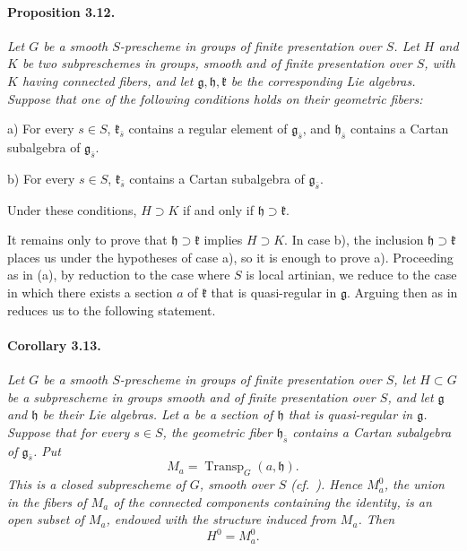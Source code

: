 
\paragraph{\textbf{Proposition 3.12.}}
{\itshape Let \(G\) be a smooth \(S\)-prescheme in groups of finite
presentation over \(S\). Let \(H\) and \(K\) be two subpreschemes
in groups, smooth and of finite presentation over \(S\), with
\(K\) having connected fibers, and let
\(\mathfrak g,\mathfrak h,\mathfrak k\) be the corresponding Lie
algebras. Suppose that one of the following conditions holds on
their geometric fibers:

\smallskip
\noindent
\textup{a)}
For every \(s\in S\), \(\mathfrak k_{\bar s}\) contains a regular
element of \(\mathfrak g_{\bar s}\), and
\(\mathfrak h_{\bar s}\) contains a Cartan subalgebra of
\(\mathfrak g_{\bar s}\).

\smallskip
\noindent
\textup{b)}
For every \(s\in S\), \(\mathfrak k_{\bar s}\) contains a Cartan
subalgebra of \(\mathfrak g_{\bar s}\).

\smallskip
\noindent
Under these conditions, \(H\supset K\) if and only if
\(\mathfrak h\supset\mathfrak k\).}

It remains only to prove that
\(\mathfrak h\supset\mathfrak k\) implies \(H\supset K\). In case
\textup{b)}, the inclusion
\(\mathfrak h\supset\mathfrak k\) places us under the hypotheses of
case \textup{a)}, so it is enough to prove \textup{a)}. Proceeding
as in \textup{(a)}, by reduction to the case where \(S\) is
local artinian, we reduce to the case in which there exists a
section \(a\) of \(\mathfrak k\) that is quasi-regular in
\(\mathfrak g\). Arguing then as in  reduces us to the
following statement.

\paragraph{\textbf{Corollary 3.13.}}
{\itshape Let \(G\) be a smooth \(S\)-prescheme in groups of finite
presentation over \(S\), let \(H\subset G\) be a subprescheme in
groups smooth and of finite presentation over \(S\), and let
\(\mathfrak g\) and \(\mathfrak h\) be their Lie algebras. Let
\(a\) be a section of \(\mathfrak h\) that is quasi-regular in
\(\mathfrak g\). Suppose that for every \(s\in S\), the geometric
fiber \(\mathfrak h_{\bar s}\) contains a Cartan subalgebra of
\(\mathfrak g_{\bar s}\). Put
\[
  M_a=\operatorname{Transp}_G(a,\mathfrak h).
\]
This is a closed subprescheme of \(G\), smooth over \(S\)
\textup{(cf.\ )}. Hence \(M_a^0\), the union in the fibers of
\(M_a\) of the connected components containing the identity, is
an open subset of \(M_a\), endowed with the structure induced from
\(M_a\). Then
\[
  H^0=M_a^0.
\]}

